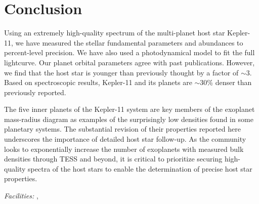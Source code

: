 \documentclass[oneside]{emulateapj}
\begin{document}
\section{Conclusion}

Using an extremely high-quality spectrum of the multi-planet host star Kepler-11, we have measured the stellar fundamental parameters and abundances to percent-level precision. We have also used a photodynamical model to fit the full \Kepler lightcurve. Our planet orbital parameters agree with past publications. However, we find that the host star is younger than previously thought by a factor of $\sim$3. Based on spectroscopic results, Kepler-11 and its planets are $\sim$30\% denser than previously reported.

The five inner planets of the Kepler-11 system are key members of the exoplanet mass-radius diagram as examples of the surprisingly low densities found in some planetary systems. The substantial revision of their properties reported here underscores the importance of detailed host star follow-up. As the community looks to exponentially increase the number of exoplanets with measured bulk densities through TESS and beyond, it is critical to prioritize securing high-quality spectra of the host stars to enable the determination of precise host star properties.

\bigskip
{}

{\it Facilities:} , 




\end{document}
